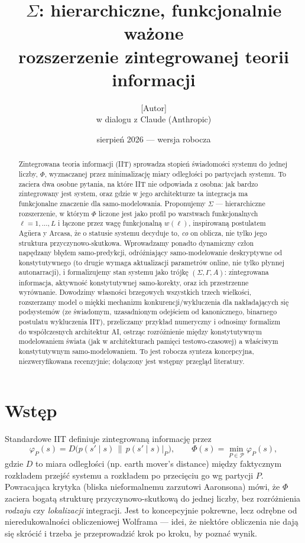 \documentclass[11pt]{article}
\title{\textbf{$\Sigma$: hierarchiczne, funkcjonalnie ważone\\ rozszerzenie zintegrowanej teorii informacji}}
\author{[Autor]\\ \small w dialogu z Claude (Anthropic)}
\date{sierpień 2026 --- wersja robocza}
\begin{document}
\maketitle

\begin{abstract}
Zintegrowana teoria informacji (IIT) sprowadza stopień świadomości systemu do jednej liczby, $\Phi$, wyznaczanej przez minimalizację miary odległości po partycjach systemu. To zaciera dwa osobne pytania, na które IIT nie odpowiada z osobna: jak bardzo zintegrowany jest system, oraz gdzie w jego architekturze ta integracja ma funkcjonalne znaczenie dla samo-modelowania. Proponujemy $\Sigma$ --- hierarchiczne rozszerzenie, w którym $\Phi$ liczone jest jako profil po warstwach funkcjonalnych $\ell=1,\dots,L$ i łączone przez wagę funkcjonalną $w(\ell)$, inspirowaną postulatem Ag\"uera y Arcasa, że o statusie systemu decyduje to, \emph{co} on oblicza, nie tylko jego struktura przyczynowo-skutkowa. Wprowadzamy ponadto dynamiczny człon napędzany błędem samo-predykcji, odróżniający samo-modelowanie deskryptywne od konstytutywnego (to drugie wymaga aktualizacji parametrów online, nie tylko płynnej autonarracji), i formalizujemy stan systemu jako trójkę $(\Sigma,\Gamma,A)$: zintegrowana informacja, aktywność konstytutywnej samo-korekty, oraz ich przestrzenne wyrównanie. Dowodzimy własności brzegowych wszystkich trzech wielkości, rozszerzamy model o miękki mechanizm konkurencji/wykluczenia dla nakładających się podsystemów (ze świadomym, uzasadnionym odejściem od kanonicznego, binarnego postulatu wykluczenia IIT), przeliczamy przykład numeryczny i odnosimy formalizm do współczesnych architektur AI, ostrząc rozróżnienie między konstytutywnym modelowaniem świata (jak w architekturach pamięci testowo-czasowej) a właściwym konstytutywnym samo-modelowaniem. To jest robocza synteza koncepcyjna, niezweryfikowana recenzyjnie; dołączony jest wstępny przegląd literatury.
\end{abstract}

\section{Wstęp}

Standardowe IIT definiuje zintegrowaną informację przez
\[
\varphi_P(s) = D\big(p(s'\mid s)\,\|\,p(s'\mid s)|_P\big), \qquad \Phi(s) = \min_{P\in\mathcal P}\varphi_P(s),
\]
gdzie $D$ to miara odległości (np. earth mover's distance) między faktycznym rozkładem przejść systemu a rozkładem po przecięciu go wg partycji $P$. Powracająca krytyka (bliska nieformalnemu zarzutowi Aaronsona) mówi, że $\Phi$ zaciera bogatą strukturę przyczynowo-skutkową do jednej liczby, bez rozróżnienia \emph{rodzaju} czy \emph{lokalizacji} integracji. Jest to koncepcyjnie pokrewne, lecz odrębne od nieredukowalności obliczeniowej Wolframa --- idei, że niektóre obliczenia nie dają się skrócić i trzeba je przeprowadzić krok po kroku, by poznać wynik.
\end{document}
